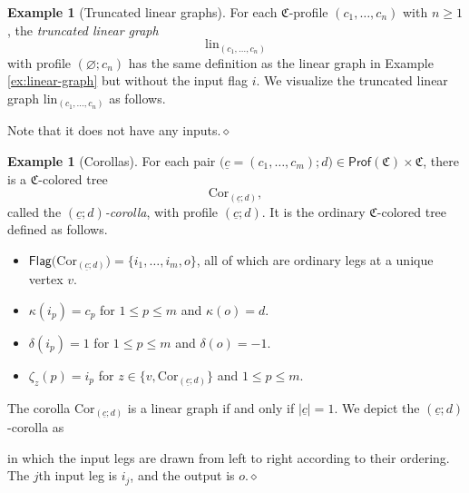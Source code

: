 \documentclass{amsbook}
\numberwithin{section}{chapter}
\numberwithin{subsection}{section}
\numberwithin{equation}{section}
\theoremstyle{plain}
\theoremstyle{definition}
\newtheorem{example}[equation]{Example}
\newcommand{\colorc}{\mathfrak{C}}
\newcommand{\Cor}{\mathrm{Cor}}
\newcommand{\Flag}{\mathsf{Flag}}
\newcommand{\lin}{\mathrm{lin}}
\newcommand{\Prof}{\mathsf{Prof}}
\newcommand{\Profc}{\Prof(\colorc)}
\newcommand{\Profcc}{\Profc \times \colorc}
\newcommand{\dqed}{\hfill$\diamond$}
\newcommand{\uc}{\underline c}
\begin{document}
\begin{example}[Truncated linear graphs]\label{ex:truncated-linear-graph}
For each $\colorc$-profile $(c_1,\ldots,c_n)$ with $n \geq 1$, the \emph{truncated linear graph} \[\lin_{(c_1,\ldots,c_n)}\] with profile $(\varnothing;c_n)$ has the same definition as the linear graph in Example \ref{ex:linear-graph} but without the input flag $i$.  We visualize the truncated linear graph $\lin_{(c_1,\ldots,c_n)}$ as follows.
\begin{center}\end{center}
Note that it does not have any inputs.\dqed
\end{example}

\begin{example}[Corollas]\label{ex:cd-corolla}
For each pair $\bigl(\uc=(c_1,\ldots,c_m); d\bigr) \in \Profcc$, there is a $\colorc$-colored tree \[\Cor_{(\uc;d)},\] called the \emph{$(\uc;d)$-corolla}\label{notation:cdcorolla}, with profile $(\uc;d)$.  It is the ordinary $\colorc$-colored tree defined as follows.
\begin{itemize}
\item $\Flag\bigl(\Cor_{(\uc;d)}\bigr) = \{i_1,\ldots,i_{m},o\}$, all of which are ordinary legs at a unique vertex $v$.
\item $\kappa(i_p)=c_p$ for $1 \leq p \leq m$ and $\kappa(o)=d$.
\item $\delta(i_p)=1$ for $1 \leq p \leq m$ and $\delta(o)=-1$.
\item $\zeta_z(p)=i_p$ for $z \in \bigl\{v, \Cor_{(\uc;d)}\bigr\}$ and $1 \leq p \leq m$.
\end{itemize}
The corolla $\Cor_{(\uc;d)}$ is a linear graph if and only if $|\uc|=1$.  We depict the $(\uc;d)$-corolla as
\begin{center}\end{center}
in which the input legs are drawn from left to right according to their ordering.  The $j$th input leg is $i_j$, and the output is $o$.\dqed
\end{example}
\end{document}
